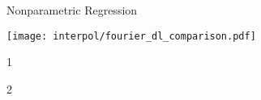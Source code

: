 \begin{frame}[fragile]{Nonparametric Regression}

	\texttt{[image: interpol/fourier\_dl\_comparison.pdf]}
    \begin{cptitemize}
        {\item 1
        \item 2}
    \end{cptitemize}

\end{frame}

\begin{frame}[fragile]

    \vspace{-1cm}
    \tiny
    
    \normalsize
\end{frame}